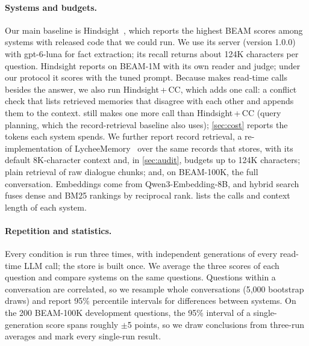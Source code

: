 \paragraph{Systems and budgets.}
Our main baseline is Hindsight~\citep{latimer2025hindsight}, which reports the highest BEAM scores among systems with
released code that we could run. We use its server (version 1.0.0) with gpt-6-luna for fact extraction; its recall
returns about 124K characters per question. Hindsight reports  on BEAM-1M with its own reader and judge;
under our protocol it scores  with the tuned prompt. Because \method{} makes read-time calls besides the
answer, we also run Hindsight\,+\,CC, which adds one call: a conflict check that lists retrieved memories that
disagree with each other and appends them to the context. \method{} still makes one more call than Hindsight\,+\,CC
(query planning, which the record-retrieval baseline also uses); \cref{sec:cost} reports the tokens each system
spends. We further report record retrieval, a re-implementation of LycheeMemory~\citep{li2026lychee} over the same
records that \method{} stores, with its default 8K-character context and, in \cref{sec:audit}, budgets up to 124K
characters; plain retrieval of raw dialogue chunks; and, on BEAM-100K, the full conversation. Embeddings come from
Qwen3-Embedding-8B, and hybrid search fuses dense and BM25 rankings by reciprocal rank.  lists the
calls and context length of each system.

\paragraph{Repetition and statistics.}
Every condition is run three times, with independent generations of every read-time LLM call; the store is built
once. We average the three scores of each question and compare systems on the same questions. Questions within a
conversation are correlated, so we resample whole conversations (5,000 bootstrap draws) and report 95\% percentile
intervals for differences between systems. On the 200 BEAM-100K development questions, the 95\% interval of a
single-generation score spans roughly $\pm$5 points, so we draw conclusions from three-run averages and mark every
single-run result.

